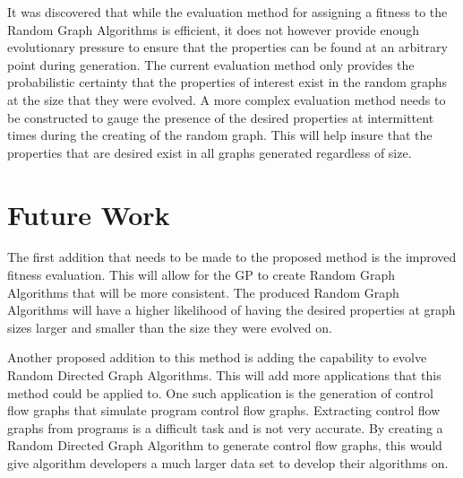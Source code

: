 \documentclass{article}
\begin{document}
It was discovered that while the evaluation method for assigning a fitness to the Random Graph Algorithms is efficient, it does not however provide
enough evolutionary pressure to ensure that the properties can be found at an arbitrary point during generation. The current evaluation method only 
provides the probabilistic certainty that the properties of interest exist in the random graphs at the size that they were evolved. A more complex evaluation
method needs to be constructed to gauge the presence of the desired properties at intermittent times during the creating of the random graph. This will
help insure that the properties that are desired exist in all graphs generated regardless of size. 


\section{Future Work}
The first addition that needs to be made to the proposed method is the improved fitness evaluation. This will allow for the GP to create Random Graph
Algorithms that will be more consistent. The produced Random Graph Algorithms will have a higher likelihood of having the desired properties at
graph sizes larger and smaller than the size they were evolved on.

Another proposed addition to this method is adding the capability to evolve Random Directed Graph Algorithms. This will add more applications
that this method could be applied to. One such application is the generation of control flow graphs that simulate program control flow graphs. Extracting
control flow graphs from programs is a difficult task and is not very accurate. By creating a Random Directed Graph Algorithm to generate control flow graphs,
this would give algorithm developers a much larger data set to develop their algorithms on. 



 
\end{document}
